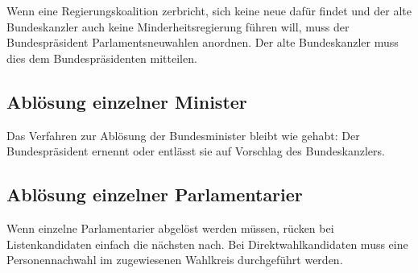 Wenn eine Regierungskoalition zerbricht, sich keine neue dafür findet und der alte Bundeskanzler auch keine Minderheitsregierung
führen will, muss der Bundespräsident Parlamentsneuwahlen anordnen.
Der alte Bundeskanzler muss dies dem Bundespräsidenten mitteilen.

\subsection{Ablösung einzelner Minister}
Das Verfahren zur Ablösung der Bundesminister bleibt wie gehabt: Der Bundespräsident ernennt oder entlässt sie auf Vorschlag des Bundeskanzlers.

\subsection{Ablösung einzelner Parlamentarier} \label {abloesung_einzelner_parlamentarier}
Wenn einzelne Parlamentarier abgelöst werden müssen, rücken bei Listenkandidaten einfach die nächsten nach.
Bei Direktwahlkandidaten muss eine Personennachwahl im zugewiesenen Wahlkreis durchgeführt werden.
